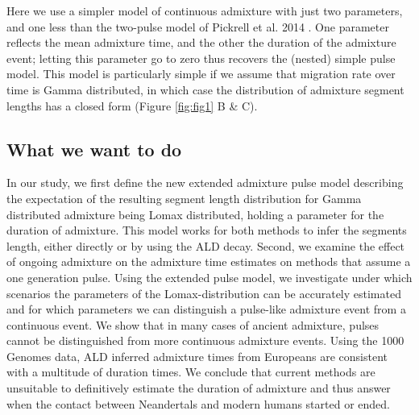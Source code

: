 \documentclass[]{article}
\begin{document}
Here we use a simpler model of continuous admixture with just two parameters, and one less than the two-pulse model of Pickrell et al. 2014 \citep{pickrell_ancient_2014}. One parameter reflects the mean admixture time, and the other the duration of the admixture event; letting this parameter go to zero thus recovers the (nested) simple pulse model. 
This model is particularly simple if we assume that migration rate over time is Gamma distributed, in which case the distribution of admixture segment lengths has a closed form (Figure \ref{fig:fig1} B & C).

\subsection{What we want to do}\label{what-we-want-to-do}

In our study, we first define the new extended admixture pulse model describing the expectation of the resulting segment length distribution for Gamma distributed admixture being Lomax distributed, holding a parameter for the duration of admixture. This model works for
both methods to infer the segments length, either directly or by using
the ALD decay. Second, we examine the effect of ongoing admixture on the admixture time estimates on methods that assume a one generation pulse. Using the extended pulse model, we investigate under which scenarios the parameters of the Lomax-distribution can be accurately estimated and for which parameters we can distinguish a pulse-like admixture event from a continuous event. We show that in many cases of ancient admixture, pulses cannot be distinguished from more continuous admixture events. Using the 1000 Genomes data, ALD inferred admixture times from Europeans are consistent with a multitude of duration times.
We conclude that current methods are unsuitable to definitively estimate the duration of admixture and thus answer when the contact between Neandertals and modern humans started or ended.

\hypertarget{refs}{}


\end{document}
